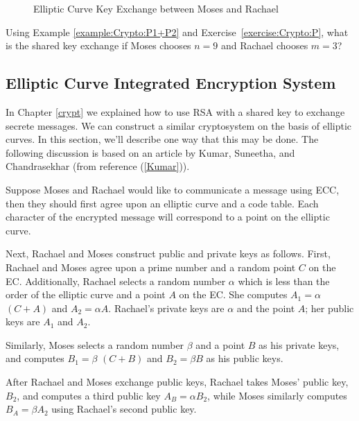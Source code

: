 \begin{figure}[H]
	  \caption{\label{fig:DH:DHKE_8} Elliptic Curve Key Exchange between Moses and Rachael }
\end{figure}

\begin{exer}
Using Example \ref{example:Crypto:P1+P2} and Exercise~\ref{exercise:Crypto:P}, what is the shared key exchange if Moses chooses $n = 9$ and Rachael chooses $m = 3$?
\end{exer}
\subsection{Elliptic Curve Integrated Encryption System} 
In Chapter \ref{crypt} we explained how to use RSA with a shared key to exchange secrete messages.  We can construct a similar cryptosystem on the basis of elliptic curves. In this section, we'll describe one way that this may be done. The following discussion is based on an article by Kumar, Suneetha, and Chandrasekhar (from reference (\ref{Kumar})).

Suppose Moses and Rachael would like to communicate a message using ECC, then they should first agree upon an elliptic curve and a code table. Each character of the encrypted message will correspond to a point on the elliptic curve.

Next, Rachael and Moses construct public and private keys as follows. First, Rachael and Moses agree upon a prime number and a random point $C$ on the EC. Additionally, Rachael selects a random number $\alpha$ which is less than the order of the elliptic curve and a point $A$ on the EC. She computes $A_1 = $$\alpha$ $(C + A)$ and $A_2= $$\alpha$$A$. Rachael's private keys are $\alpha$ and the point $A$; her public keys are $A_1$ and $A_2$. 

Similarly, Moses selects a random number $\beta$ and a point $B$ as his private keys, and computes $B_1 = $$\beta$ $(C + B)$ and $B_2= $$\beta$$B$ as his public keys. 

After Rachael and Moses exchange public keys, Rachael takes Moses' public key, $B_2$, and computes a third public key $A_B = $$\alpha$$B_2$, while Moses similarly computes $B_A = $$\beta$$A_2$ using Rachael's second public key. 

